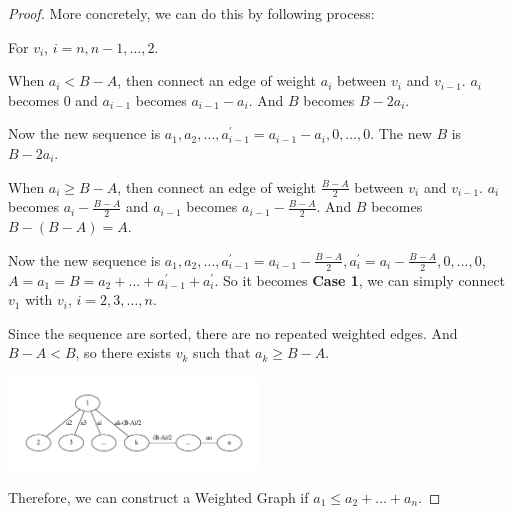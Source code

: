 \begin{exercise}
\begin{proof}
    More concretely, we can do this by following process:

    For $v_i$, $i=n, n-1, \dots, 2$.

    When $a_i < B - A$, then connect an edge of weight $a_i$ between $v_i$ and $v_{i-1}$. $a_i$ becomes 0 and $a_{i-1}$ becomes $a_{i-1} - a_i$. And $B$ becomes $B - 2 a_i$.

    Now the new sequence is $a_1, a_2, \dots, a_{i-1}^\prime = a_{i-1} - a_i, 0, \dots, 0$. The new $B$ is $B - 2 a_i$.

    When $a_i \geq B - A$, then connect an edge of weight $\frac{B-A}{2}$ between $v_i$ and $v_{i-1}$. $a_i$ becomes $a_i - \frac{B-A}{2}$ and $a_{i-1}$ becomes $a_{i-1} - \frac{B-A}{2}$. And $B$ becomes $B - (B-A)=A$.

    Now the new sequence is $a_1, a_2, \dots, a_{i-1}^\prime = a_{i-1} - \frac{B-A}{2}, a_i^\prime = a_i - \frac{B-A}{2}, 0, \dots, 0$, $A = a_1 = B = a_2 + \dots + a_{i-1}^\prime + a_i^\prime$. So it becomes \textbf{Case 1}, we can simply connect $v_1$ with $v_i$, $i=2,3,\dots,n$.

    Since the sequence are sorted, there are no repeated weighted edges. And $B-A < B$, so there exists $v_k$ such that $a_k \geq B - A$.

\begin{center}
  \includegraphics[width=0.5\textwidth]{figures/7-5.pdf}
\end{center}

    Therefore, we can construct a Weighted Graph if $a_1 \leq a_2 + \dots + a_n$.


    \end{proof}
\end{exercise}

